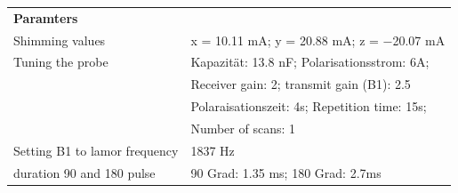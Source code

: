     \begin{tabular}{ll}

        {\bf Paramters} &            \\
        
        Shimming values & x = 10.11 mA; y = 20.88 mA; z = −20.07 mA \\
        
        Tuning the probe & Kapazität: 13.8 nF; Polarisationsstrom: 6A;\\
        & Receiver gain: 2; transmit gain (B1): 2.5\\
        & Polaraisationszeit: 4s; Repetition time: 15s; \\
        & Number of scans: 1\\
        
        Setting B1 to lamor frequency &    1837 Hz \\
        
        duration 90 and 180 pulse & 90 Grad: 1.35 ms; 180 Grad: 2.7ms \\
        \end{tabular}  
        
        \vspace{1cm}

